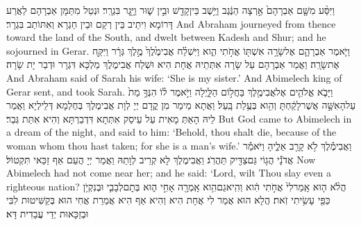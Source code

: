 \newperek
\newseder
{}%
{וַיִּסַּ֨ע מִשָּׁ֤ם אַבְרָהָם֙ אַ֣רְצָה הַנֶּ֔גֶב וַיֵּ֥שֶׁב בֵּין\maqqaf קָדֵ֖שׁ וּבֵ֣ין שׁ֑וּר וַיָּ֖גׇר בִּגְרָֽר׃}
{וּנְטַל מִתַּמָּן אַבְרָהָם לַאֲרַע דָּרוֹמָא וִיתֵיב בֵּין רְקַם וּבֵין חַגְרָא וְאִתּוֹתַב בִּגְרָר׃}
{And Abraham journeyed from thence toward the land of the South, and dwelt between Kadesh and Shur; and he sojourned in Gerar.}{}
{וַיֹּ֧אמֶר אַבְרָהָ֛ם אֶל\maqqaf שָׂרָ֥ה אִשְׁתּ֖וֹ אֲחֹ֣תִי הִ֑וא וַיִּשְׁלַ֗ח אֲבִימֶ֙לֶךְ֙ מֶ֣לֶךְ גְּרָ֔ר וַיִּקַּ֖ח אֶת\maqqaf שָׂרָֽה׃}
{וַאֲמַר אַבְרָהָם עַל שָׂרָה אִתְּתֵיהּ אֲחָת הִיא וּשְׁלַח אֲבִימֶלֶךְ מַלְכָּא דִּגְרָר וּדְבַר יָת שָׂרָה׃}
{And Abraham said of Sarah his wife: ‘She is my sister.’ And Abimelech king of Gerar sent, and took Sarah.}{}
{וַיָּבֹ֧א אֱלֹהִ֛ים אֶל\maqqaf אֲבִימֶ֖לֶךְ בַּחֲל֣וֹם הַלָּ֑יְלָה וַיֹּ֣אמֶר ל֗וֹ הִנְּךָ֥ מֵת֙ עַל\maqqaf הָאִשָּׁ֣ה אֲשֶׁר\maqqaf לָקַ֔חְתָּ וְהִ֖וא בְּעֻ֥לַת בָּֽעַל׃}
{וַאֲתָא מֵימַר מִן קֳדָם יְיָ לְוָת אֲבִימֶלֶךְ בְּחֶלְמָא דְּלֵילְיָא וַאֲמַר לֵיהּ הָאַתְּ מָאִית עַל עֵיסַק אִתְּתָא דִּדְבַרְתָּא וְהִיא אִתַּת גְּבַר׃}
{But God came to Abimelech in a dream of the night, and said to him: ‘Behold, thou shalt die, because of the woman whom thou hast taken; for she is a man’s wife.’}{}
{וַאֲבִימֶ֕לֶךְ לֹ֥א קָרַ֖ב אֵלֶ֑יהָ וַיֹּאמַ֕ר אֲדֹנָ֕י הֲג֥וֹי גַּם\maqqaf צַדִּ֖יק תַּהֲרֹֽג׃}
{וַאֲבִימֶלֶךְ לָא קְרֵיב לְוָתַהּ וַאֲמַר יְיָ הֲעַם אַף זַכַּאי תִּקְטוֹל׃}
{Now Abimelech had not come near her; and he said: ‘Lord, wilt Thou slay even a righteous nation?}{}
{הֲלֹ֨א ה֤וּא אָֽמַר\maqqaf לִי֙ אֲחֹ֣תִי הִ֔וא וְהִֽיא\maqqaf גַם\maqqaf הִ֥וא אָֽמְרָ֖ה אָחִ֣י ה֑וּא בְּתׇם\maqqaf לְבָבִ֛י וּבְנִקְיֹ֥ן כַּפַּ֖י עָשִׂ֥יתִי זֹֽאת׃}
{הֲלָא הוּא אֲמַר לִי אֲחָת הִיא וְהִיא אַף הִיא אֲמַרַת אֲחִי הוּא בְּקַשִּׁיטוּת לִבִּי וּבְזַכָּאוּת יְדַי עֲבַדִית דָּא׃}
